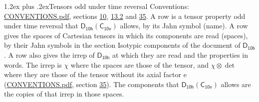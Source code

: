 \documentclass[10pt,a4paper]{article}
\makeatletter
\renewcommand\section{\@startsection{section}{1}{\z@}{-3ex plus -1ex minus -.2ex}%
  {1.2ex plus .2ex}{\normalfont\large\sffamily\bfseries\color{parttitle}}}
\numberwithin{equation}{section}
\newcommand{\grp}[1]{\mathsf{#1}}
\newcommand{\irrprod}{\otimes}
\makeatother
\begin{document}
\section{Tensors odd under time reversal}\label{s:time_odd}
Conventions: \href{../../CONVENTIONS.pdf}{CONVENTIONS.pdf}, sections \href{../../../rotation/CONVENTIONS.pdf\#conv.10}{10}, \href{../../../rotation/CONVENTIONS.pdf\#conv.13.2}{13.2} and \href{../../CONVENTIONS.pdf\#conv.35}{35}.
\leavevmode\label{n:head.name.property}A row is a tensor property odd under time reversal that $\grp{D_{10h}}(\grp{C_{10v}})$ allows, by its Jahn symbol (name). \label{n:head.spaces}A row gives the spaces of Cartesian tensors in which its components are read (spaces), by their Jahn symbols in the section Isotypic components of the document of \href{../../../rotation/data/pdf/D10h.pdf}{$\grp{D_{10h}}$}. \label{n:head.properties}A row also gives the irrep of $\grp{D_{10h}}$ at which they are read and the properties in words. The irrep is $\chi$ where the spaces are those of the tensor, and $\chi \irrprod \det$ where they are those of the tensor without its axial factor e (\href{../../CONVENTIONS.pdf}{CONVENTIONS.pdf}, section \href{../../CONVENTIONS.pdf\#conv.35}{35}). The components that $\grp{D_{10h}}(\grp{C_{10v}})$ allows are the copies of that irrep in those spaces.
\end{document}
